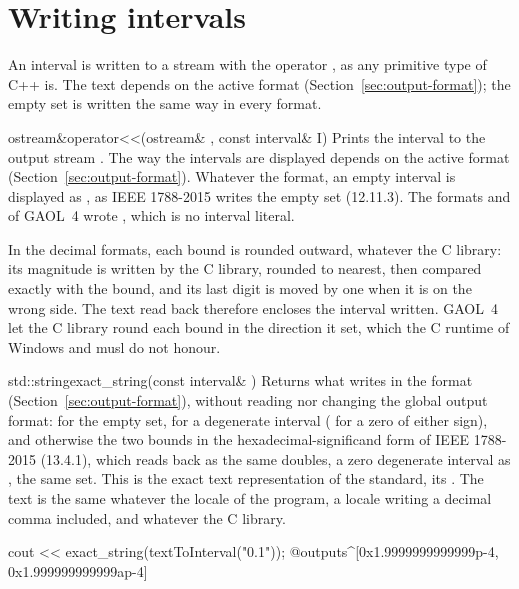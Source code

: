 \documentclass[12pt,a4paper,twoside,openright]{book}
\begin{document}
\section{Writing intervals}\label{sec:writing}

An interval is written to a stream with the operator \code{<{}<}, as any
primitive type of C++ is. The text depends on the active format
(Section~\ref{sec:output-format}); the empty set is written the same way in
every format.
%

\begin{deffun}{ostream\&}{operator<{}<}{(ostream\& , const interval\& I)}
  Prints the interval  to the output stream . The way the
  intervals are displayed depends on the active format
  (Section~\ref{sec:output-format}). Whatever the format, an empty interval
  is displayed as \code{[empty]}, as IEEE 1788-2015 writes the empty set
  (12.11.3).\newinvfive{} The formats  and 
  of GAOL~4 wrote , which is no interval literal.
\end{deffun}

\noindent
In the decimal formats, each bound is rounded outward, whatever the C
library: its magnitude is written by the C library, rounded to nearest, then
compared exactly with the bound, and its last digit is moved by one when it
is on the wrong side. The text read back therefore encloses the interval
written.\newinvfive{} GAOL~4 let the C library round each bound in the
direction it set, which the C runtime of Windows and musl do not honour.

\begin{deffun}{std::string}{exact\_string}{(const interval\& )}
  Returns what  writes in the format 
  (Section~\ref{sec:output-format}), without reading nor changing the global
  output format:  for the empty set,  for a
  degenerate interval ( for a zero of either sign), and
  otherwise the two bounds in the hexadecimal-significand form of IEEE
  1788-2015 (13.4.1), which  reads back as the same
  doubles, a zero degenerate interval as , the same set. This is
  the exact text representation of the standard, its
  .\newinvfive{} The text is the same whatever the
  locale of the program, a locale writing a decimal comma included, and
  whatever the C library.
\begin{example}
cout << exact_string(textToInterval("0.1"));
@outputs^[0x1.9999999999999p-4, 0x1.999999999999ap-4]~
\end{example}
\end{deffun}
\end{document}
